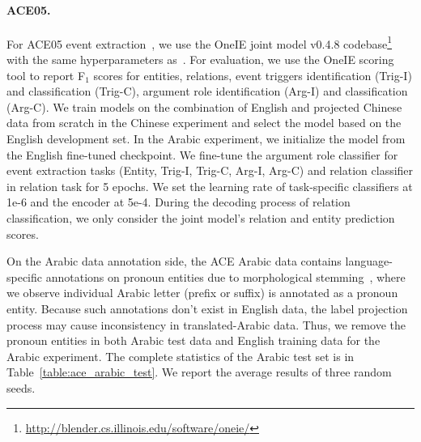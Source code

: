 \documentclass[11pt,dvipsnames]{article}
\begin{document}
\paragraph{ACE05.}
For ACE05 event extraction~\citep{walker2006ace}, 
we use the OneIE joint model v0.4.8 codebase\footnote{\url{http://blender.cs.illinois.edu/software/oneie/}} with the same hyperparameters as~\citet{wu-2021-everything}. 
For evaluation, we use the OneIE scoring tool to report F$_1$ scores for entities, relations, event triggers identification (Trig-I) and classification (Trig-C), argument role identification (Arg-I) and classification (Arg-C). 
We train models on the combination of English and  projected Chinese data from scratch in the Chinese experiment and select the model based on the English development set.
In the Arabic experiment, we initialize the model from the English fine-tuned checkpoint. We fine-tune the argument role classifier for event extraction tasks (Entity, Trig-I, Trig-C, Arg-I, Arg-C) and relation classifier in relation task for 5 epochs.  We set the learning rate of task-specific classifiers at 1e-6 and the encoder at 5e-4.
During the decoding process of relation classification, we only consider the joint model's relation and entity prediction scores.

On the Arabic data annotation side, the ACE Arabic data contains language-specific annotations on pronoun entities due to morphological stemming~\citep{zitouni2005arabic}, where we observe individual Arabic letter (prefix or suffix) is annotated as a pronoun entity.
Because such annotations don't exist in English data, the label projection process may cause inconsistency in translated-Arabic data.
Thus, we remove the pronoun entities in both Arabic test data and English training data for the Arabic experiment. The complete statistics of the Arabic test set is in Table~\ref{table:ace_arabic_test}. 
We report the average results of three random seeds.
\end{document}
